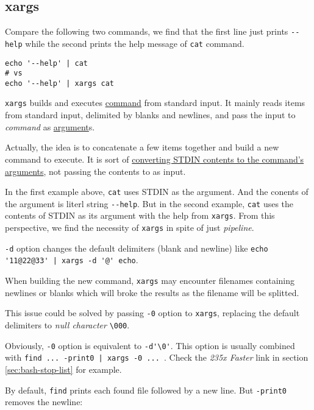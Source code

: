 \subsection{xargs}
\label{sec:gnu-xargs}

Compare the following two commands, we find that the first line
just prints \verb|--help| while the second prints the help message
of \lstinline|cat| command.

\begin{lstlisting}
echo '--help' | cat
# vs
echo '--help' | xargs cat
\end{lstlisting}

\lstinline|xargs| builds and executes \uline{command} from
standard input. It mainly reads items from standard input,
delimited by blanks and newlines, and pass the input to
\textit{command} as \uline{argument}s.

Actually, the idea is to concatenate a few items together and build
a new command to execute. It is sort of
\href{https://superuser.com/a/600273/221946}{converting STDIN
  contents to the command's arguments}, not passing the contents
to as input.

In the first example above, \lstinline|cat| uses STDIN as the
argument. And the conents of the argument is literl string
\verb|--help|. But in the second example, \lstinline|cat| uses the
contents of STDIN as its argument with the help from
\lstinline|xargs|. From this perspective, we find the necessity of
\lstinline|xargs| in spite of just \textit{pipeline}.

\lstinline|-d| option changes the default delimiters (blank and
newline) like \lstinline/echo '11@22@33' | xargs -d '@' echo/.

When building the new command, \lstinline|xargs| may encounter
filenames containing newlines or blanks which will broke the
results as the filename will be splitted.

This issue could be solved by passing \lstinline|-0| option to
\lstinline|xargs|, replacing the default delimiters to
\textit{null character} \lstinline|\000|.

Obviously, \lstinline|-0| option is equivalent to
\lstinline|-d'\0'|. This option is usually combined with
\lstinline/find ... -print0 | xargs -0 ... /. Check the
\textit{235x Faster} link in section \ref{sec:bash-stop-list} for
example.

By default, \lstinline|find| prints each found file followed by a
new line. But \lstinline|-print0| removes the newline:

